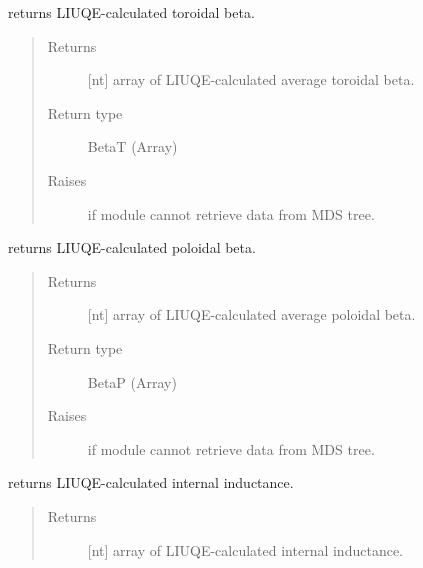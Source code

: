 \documentclass[letterpaper,10pt,english]{sphinxmanual}
\begin{document}
\begin{fulllineitems}
\begin{fulllineitems}
\label{\detokenize{eqtools:eqtools.TCVLIUQE.TCVLIUQETree.getBetaT}}
returns LIUQE-calculated toroidal beta.
\begin{quote}\begin{description}
\item[{Returns}] \leavevmode
{[}nt{]} array of LIUQE-calculated average toroidal beta.

\item[{Return type}] \leavevmode
BetaT (Array)

\item[{Raises}] \leavevmode
{} \textendash{} if module cannot retrieve data from MDS tree.

\end{description}\end{quote}

\end{fulllineitems}


\begin{fulllineitems}
\label{\detokenize{eqtools:eqtools.TCVLIUQE.TCVLIUQETree.getBetaP}}
returns LIUQE-calculated poloidal beta.
\begin{quote}\begin{description}
\item[{Returns}] \leavevmode
{[}nt{]} array of LIUQE-calculated average poloidal beta.

\item[{Return type}] \leavevmode
BetaP (Array)

\item[{Raises}] \leavevmode
{} \textendash{} if module cannot retrieve data from MDS tree.

\end{description}\end{quote}

\end{fulllineitems}


\begin{fulllineitems}
\label{\detokenize{eqtools:eqtools.TCVLIUQE.TCVLIUQETree.getLi}}
returns LIUQE-calculated internal inductance.
\begin{quote}\begin{description}
\item[{Returns}] \leavevmode
{[}nt{]} array of LIUQE-calculated internal inductance.


\end{description}
\end{quote}
\end{fulllineitems}
\end{fulllineitems}
\end{document}
